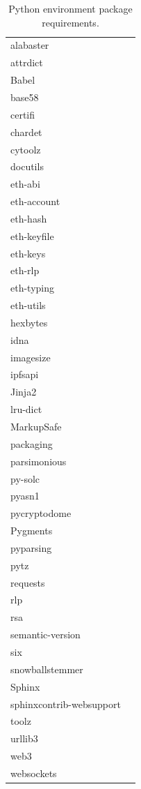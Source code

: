 \documentclass[titlepage]{report}
\begin{document}
\begin{table}
    \begin{center}
        \begin{tabular}{| l | p{5cm} |}
            alabaster\\
            attrdict\\
            Babel\\
            base58\\
            certifi\\
            chardet\\
            cytoolz\\
            docutils\\
            eth-abi\\
            eth-account\\
            eth-hash\\
            eth-keyfile\\
            eth-keys\\
            eth-rlp\\
            eth-typing\\
            eth-utils\\
            hexbytes\\
            idna\\
            imagesize\\
            ipfsapi\\
            Jinja2\\
            lru-dict\\
            MarkupSafe\\
            packaging\\
            parsimonious\\
            py-solc\\
            pyasn1\\
            pycryptodome\\
            Pygments\\
            pyparsing\\
            pytz\\
            requests\\
            rlp\\
            rsa\\
            semantic-version\\
            six\\
            snowballstemmer\\
            Sphinx\\
            sphinxcontrib-websupport\\
            toolz\\
            urllib3\\
            web3\\
            websockets
        \end{tabular}
        \caption{Python environment package requirements.}
    \end{center}
\label{tab:package}
\end{table}
\end{document}
